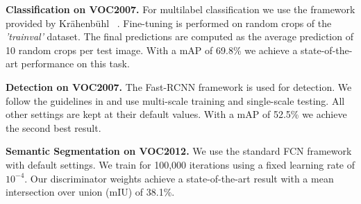 \documentclass[10pt,twocolumn,letterpaper]{article}
\begin{document}
\textbf{Classification on VOC2007.}
 For multilabel classification we use the framework provided by Kr\"ahenb\"uhl \etal~\cite{krahenbuhl2015data}. Fine-tuning is performed on random crops of the \emph{'trainval'} dataset. The final predictions are computed as the average prediction of 10 random crops per test image. With a mAP of 69.8\% we achieve a state-of-the-art performance on this task.

\textbf{Detection on VOC2007.}
The Fast-RCNN \cite{girshickICCV15fastrcnn} framework is used for detection. We follow the guidelines in \cite{krahenbuhl2015data} and use multi-scale training and single-scale testing. All other settings are kept at their default values. With a mAP of 52.5\% we achieve the second best result. 

\textbf{Semantic Segmentation on VOC2012.}
We use the standard FCN framework \cite{long2015fully} with default settings. We train for 100,000 iterations using a fixed learning rate of $10^{-4}$. Our discriminator weights achieve a state-of-the-art result with a mean intersection over union (mIU) of 38.1\%.
\end{document}
